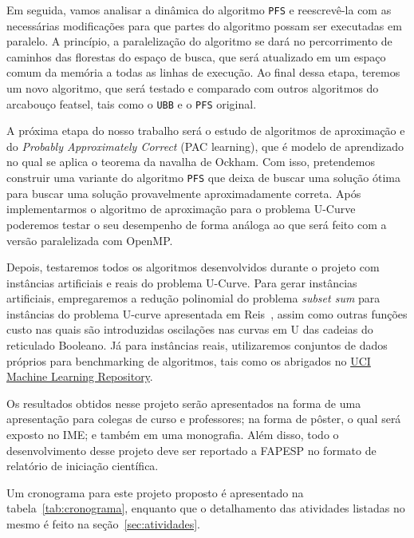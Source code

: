 \documentclass[12pt]{article}
\begin{document}
Em seguida, vamos analisar a dinâmica do algoritmo {\tt PFS} e
reescrevê-la com as necessárias modificações para que partes do
algoritmo possam ser executadas em paralelo. A princípio, a
paralelização do algoritmo se dará no percorrimento de caminhos das
florestas do espaço de busca, que será atualizado em um espaço comum da
memória a todas as linhas de execução. Ao final dessa etapa, teremos um
novo algoritmo, que será testado e comparado com outros algoritmos do
arcabouço featsel, tais como o {\tt UBB} e o {\tt PFS} original.

A próxima etapa do nosso trabalho será o estudo de algoritmos de 
aproximação e do \textit{Probably Approximately
Correct} (PAC learning), que é modelo de aprendizado no qual se aplica o
teorema da navalha de Ockham. Com isso, pretendemos construir uma 
variante do algoritmo {\tt PFS} que deixa de buscar uma solução ótima 
para buscar uma solução provavelmente aproximadamente correta. Após 
implementarmos o algoritmo de aproximação para o problema U-Curve 
poderemos testar o seu desempenho de forma análoga ao que será feito 
com a versão paralelizada com OpenMP.

Depois, testaremos todos os algoritmos desenvolvidos durante o projeto
com instâncias artificiais e reais do problema U-Curve. Para gerar 
instâncias artificiais, empregaremos a redução polinomial do problema 
{\em subset sum} para instâncias do problema U-curve apresentada em 
Reis~\cite{msreis thesis}, assim como outras funções custo  nas quais
são introduzidas oscilações nas curvas em U das cadeias
do reticulado Booleano. Já para instâncias reais, utilizaremos conjuntos
de dados próprios para benchmarking de algoritmos, tais como os 
abrigados no \href{archive.ics.uci.edu/ml}{UCI Machine Learning 
Repository}.

Os resultados obtidos nesse projeto serão apresentados na forma de uma
apresentação para colegas de curso e professores; na forma de pôster,
o qual será exposto no IME; e também em uma monografia. Além disso, 
todo o desenvolvimento desse projeto deve ser reportado a FAPESP no
formato de relatório de iniciação científica.

Um cronograma para este projeto proposto é apresentado na 
tabela~\ref{tab:cronograma}, enquanto que o detalhamento das atividades
listadas no mesmo é feito na seção~\ref{sec:atividades}.
\end{document}
